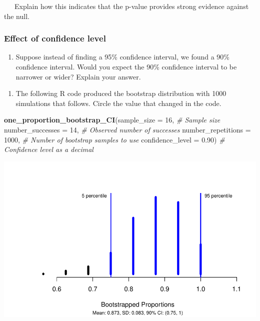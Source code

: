 \documentclass[
]{report}
\newenvironment{Shaded}{\begin{snugshade}}{\end{snugshade}}
\newcommand{\AttributeTok}[1]{\textcolor[rgb]{0.13,0.29,0.53}{#1}}
\newcommand{\CommentTok}[1]{\textcolor[rgb]{0.56,0.35,0.01}{\textit{#1}}}
\newcommand{\DecValTok}[1]{\textcolor[rgb]{0.00,0.00,0.81}{#1}}
\newcommand{\FloatTok}[1]{\textcolor[rgb]{0.00,0.00,0.81}{#1}}
\newcommand{\FunctionTok}[1]{\textcolor[rgb]{0.13,0.29,0.53}{\textbf{#1}}}
\newcommand{\NormalTok}[1]{#1}
\providecommand{\tightlist}{%
  \setlength{\itemsep}{0pt}\setlength{\parskip}{0pt}}
\begin{document}
\vspace{.2in}

~~~Explain how this indicates that the p-value provides strong evidence against the null.

\vspace{0.5in}

\subsubsection*{Effect of confidence level}\label{effect-of-confidence-level}

\begin{enumerate}
\def\labelenumi{\arabic{enumi}.}
\setcounter{enumi}{13}
\tightlist
\item
  Suppose instead of finding a 95\% confidence interval, we found a 90\% confidence interval. Would you expect the 90\% confidence interval to be narrower or wider? Explain your answer.
\end{enumerate}

\vspace{0.4in}

\begin{enumerate}
\def\labelenumi{\arabic{enumi}.}
\setcounter{enumi}{14}
\tightlist
\item
  The following R code produced the bootstrap distribution with 1000 simulations that follows. Circle the value that changed in the code.
\end{enumerate}

\begin{Shaded}
\begin{Highlighting}[]
\FunctionTok{one\_proportion\_bootstrap\_CI}\NormalTok{(}\AttributeTok{sample\_size =} \DecValTok{16}\NormalTok{, }\CommentTok{\# Sample size}
                    \AttributeTok{number\_successes =} \DecValTok{14}\NormalTok{, }\CommentTok{\# Observed number of successes}
                    \AttributeTok{number\_repetitions =} \DecValTok{1000}\NormalTok{, }\CommentTok{\# Number of bootstrap samples to use}
                    \AttributeTok{confidence\_level =} \FloatTok{0.90}\NormalTok{) }\CommentTok{\# Confidence level as a decimal}
\end{Highlighting}
\end{Shaded}

\begin{center}\includegraphics[width=0.7\linewidth]{03-A08-inference-1cat_CI-simulation_files/figure-latex/unnamed-chunk-2-1} \end{center}
\end{document}
